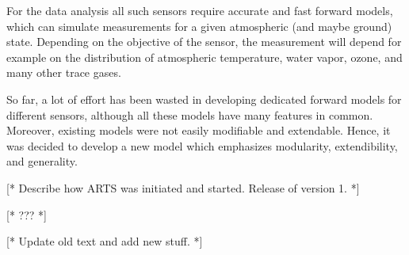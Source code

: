 For the data analysis all such sensors require accurate and
fast forward models, which can simulate measurements for a
given atmospheric (and maybe ground) state. Depending on the
objective of the sensor, the measurement will depend for
example on the distribution of atmospheric temperature, water
vapor, ozone, and many other trace gases.

So far, a lot of effort has been wasted in developing dedicated
forward models for different sensors, although all these models have
many features in common. Moreover, existing models were not easily
modifiable and extendable. Hence, it was decided to develop a new
model which emphasizes modularity, extendibility, and generality.

[* Describe how ARTS was initiated and started. Release of version 1. *]


\label{sec:intro:whatis}

[* ??? *]


\label{sec:intro:scope}

[* Update old text and add new stuff. *]





